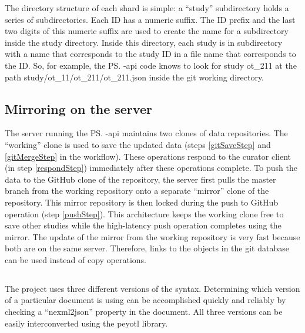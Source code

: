 \begin{methods}
The directory structure of each shard is simple: a ``study'' subdirectory holds 
a series of subdirectories.
Each ID has a numeric suffix.
The ID prefix and the last two digits of this numeric suffix are used to create the name
    for a subdirectory inside the study directory.
Inside this directory, each study is in subdirectory with a name that corresponds to the study ID
    in a file name that corresponds to the ID.
So, for example, the \ps-api code knows to look for study ot\_211 at the path
    study/ot\_11/ot\_211/ot\_211.json inside the git working directory.
\subsection*{Mirroring on the server}
The server running the \ps-api maintains two clones of data repositories.
The ``working'' clone is used to save the updated data (steps \ref{gitSaveStep} and \ref{gitMergeStep} in the workflow).
These operations respond to the curator client (in step \ref{respondStep}) immediately
    after these operations complete.
To push the data to the GitHub clone of the repository, the server first pulls the master branch from the working repository onto a separate
    ``mirror'' clone of the repository.
This mirror repository is then locked during the push to GitHub operation (step \ref{pushStep}).
This architecture keeps the working clone free to save other studies while the high-latency push operation completes using the mirror.
The update of the mirror from the working repository is very fast because both are on the same server.
Therefore, links to the objects in the git database can be used instead of copy operations.

\subsection*{\nexson}
The \otol project uses three different versions of the \nexson syntax.
Determining which version of \nexson a particular document is using
    can be accomplished quickly and reliably by checking a  ``nexml2json'' property in the document.
All three versions can be easily interconverted using the peyotl library.


\end{methods}
